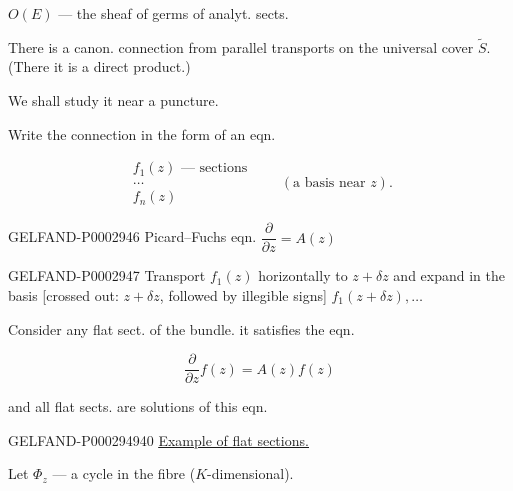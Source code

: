 $O (E)$ --- the sheaf of germs of analyt. sects.

There is a canon. connection from parallel transports on the universal cover $\tilde S$. (There it is a direct product.)

We shall study it near a puncture.

Write the connection in the form of an eqn.

\begin{equation*}\begin{array}{l}f_1(z)\text{ --- sections}\\\ldots\\f_n (z)\end{array}\qquad (\text{a basis near }z).\end{equation*}

\begin{GelfandAdjacentEvidence}{GELFAND-P000294}{6}
Picard--Fuchs eqn. $\dfrac{\partial}{\partial z}=A (z)$

\end{GelfandAdjacentEvidence}


\begin{GelfandAdjacentEvidence}{GELFAND-P000294}{7}
Transport $f_1(z)$ horizontally to $z+\delta z$ and expand in the basis [crossed out: $z+\delta z$, followed by illegible signs] $f_1(z+\delta z),\ldots$

\end{GelfandAdjacentEvidence}


Consider any flat sect. of the bundle. it satisfies the eqn.

\begin{equation*}\frac{\partial}{\partial z}f (z)=A (z)f (z)\end{equation*}

and all flat sects. are solutions of this eqn.

\begin{GelfandAdjacentEvidence}{GELFAND-P000294}{940}
\underline{\underline{Example of flat sections.}}

Let $\Phi_z$ --- a cycle in the fibre ($K$-dimensional).

\end{GelfandAdjacentEvidence}


